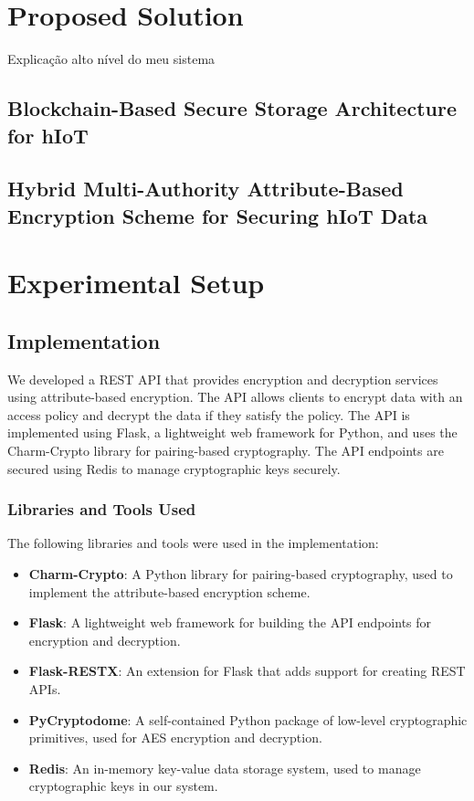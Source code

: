 \documentclass[cic,tc,english]{iiufrgs}
\begin{document}
\chapter{Proposed Solution}
    \label{chap:proposedsolution}
    Explicação alto nível do meu sistema

    \section{Blockchain-Based Secure Storage Architecture for hIoT}
        \label{sec:architecture}

    \section{Hybrid Multi-Authority Attribute-Based Encryption Scheme for Securing hIoT Data}
        \label{sec:encryption}

\chapter{Experimental Setup}
    \label{chap:experimentalsetup}

    \section{Implementation}
        \label{sec:implementation}
        We developed a REST API that provides encryption and decryption services using attribute-based encryption. The API allows clients to encrypt data with an access policy and decrypt the data if they satisfy the policy. The API is implemented using Flask, a lightweight web framework for Python, and uses the Charm-Crypto library for pairing-based cryptography. The API endpoints are secured using Redis to manage cryptographic keys securely.

        \subsection{Libraries and Tools Used}
            \label{sec:libraries}

            The following libraries and tools were used in the implementation:

            \begin{itemize}
                \item \textbf{Charm-Crypto}: A Python library for pairing-based cryptography, used to implement the attribute-based encryption scheme.
                \item \textbf{Flask}: A lightweight web framework for building the API endpoints for encryption and decryption.
                \item \textbf{Flask-RESTX}: An extension for Flask that adds support for creating REST APIs.
                \item \textbf{PyCryptodome}: A self-contained Python package of low-level cryptographic primitives, used for AES encryption and decryption.
                \item \textbf{Redis}: An in-memory key-value data storage system, used to manage cryptographic keys in our system.
            \end{itemize}
\end{document}
